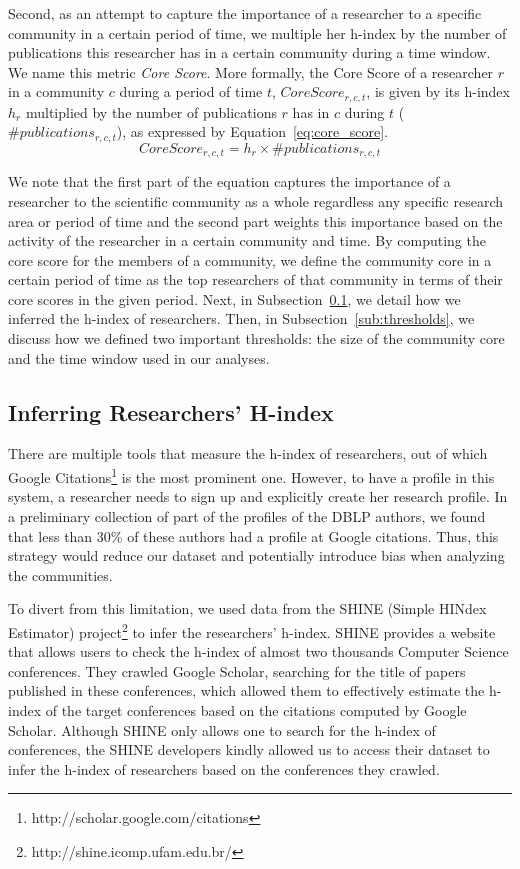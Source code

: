 \documentclass[letterpaper]{www13-companion-accepted}
\begin{document}
Second, as an attempt to capture the importance of a researcher to a specific community in a certain period of time, we multiple her h-index by the number of publications this
researcher has in a certain community during a time window. We name this metric \textit{Core Score}. More formally, the Core Score of a researcher $r$ in a community $c$ during a period of
time $t$, $Core{ }Score_{r,c,t}$, is given by its h-index $h_r$ multiplied by the number of publications $r$ has in $c$ during $t$ ($\textrm{\#}publications_{r,c,t}$),
as expressed by Equation~\ref{eq:core_score}. 
\vspace{-0.01cm}
\begin{equation} 
  \label{eq:core_score}
  Core{ }Score_{r,c,t} = h_r \times \textrm{\#}publications_{r,c,t}
\end{equation}

We note that the first part of the equation captures the importance of a researcher to the scientific community as a whole regardless any specific research area or period of time and the second part weights this
importance based on the activity of the researcher in a certain community and time.  By computing the core score for the members of a community, we define the community core in a
certain period of time as the top researchers of that community in terms of their core scores in the given period. Next, in Subsection~\ref{sub:hindex}, we detail how we inferred the
h-index of researchers. 
Then, in Subsection~\ref{sub:thresholds}, we discuss how we defined two important thresholds: the size of the community core and the time window used in our analyses.


\subsection{Inferring Researchers' H-index}
\label{sub:hindex}

There are multiple tools that measure the h-index of researchers, out of which Google Citations\footnote{http://scholar.google.com/citations} is the most prominent one.
However, to have a profile in this system, a researcher needs to sign up and explicitly create her research profile.  In a preliminary collection of part of the profiles of
the DBLP authors, we found that less than 30\% of these authors had a profile at Google citations. Thus, this strategy would reduce our dataset and
potentially introduce bias when analyzing the communities.
 
To divert from this limitation, we used data from the SHINE (Simple HINdex Estimator) project\footnote{http://shine.icomp.ufam.edu.br/} to infer the researchers' h-index.
SHINE provides a website that allows users to check the h-index of almost two thousands Computer Science conferences. They crawled Google Scholar, searching for the title of papers
published in these conferences, which allowed them to effectively estimate the h-index of the target conferences based on the citations computed by Google Scholar. Although
SHINE only allows one to search for the h-index of conferences, the SHINE developers kindly allowed us to access their dataset to infer the h-index of researchers based on the
conferences they crawled.
\end{document}
